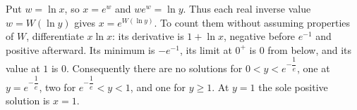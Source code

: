 Put $w=\ln x$, so $x=e^w$ and $we^w=\ln y$. Thus each real inverse value $w=W(\ln y)$ gives $x=\boxed{e^{W(\ln y)}}$. To count them without assuming properties of $W$, differentiate $x\ln x$: its derivative is $1+\ln x$, negative before $e^{-1}$ and positive afterward. Its minimum is $-e^{-1}$, its limit at $0^+$ is $0$ from below, and its value at $1$ is $0$. Consequently there are no solutions for $0<y<e^{-\dfrac{1}{e}}$, one at $y=e^{-\dfrac{1}{e}}$, two for $e^{-\dfrac{1}{e}}<y<1$, and one for $y\ge1$. At $y=1$ the sole positive solution is $x=1$.
